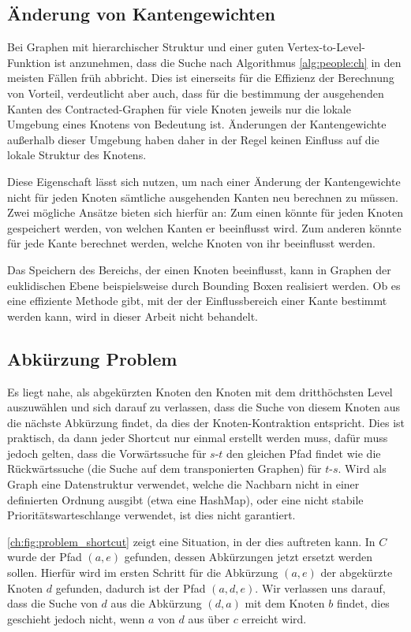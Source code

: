 \subsection{Änderung von Kantengewichten}

Bei Graphen mit hierarchischer Struktur und einer guten Vertex-to-Level-Funktion ist anzunehmen, dass die Suche nach Algorithmus \ref{alg:people:ch}  in den meisten Fällen früh abbricht.
Dies ist einerseits für die Effizienz der Berechnung von Vorteil, verdeutlicht aber auch, dass für die bestimmung der ausgehenden Kanten des Contracted-Graphen für viele Knoten jeweils nur die lokale Umgebung eines Knotens von Bedeutung ist.
Änderungen der Kantengewichte außerhalb dieser Umgebung haben daher in der Regel keinen Einfluss auf die lokale Struktur des Knotens.

Diese Eigenschaft lässt sich nutzen, um nach einer Änderung der Kantengewichte nicht für jeden Knoten sämtliche ausgehenden Kanten neu berechnen zu müssen.
Zwei mögliche Ansätze bieten sich hierfür an:
Zum einen könnte für jeden Knoten gespeichert werden, von welchen Kanten er beeinflusst wird.
Zum anderen könnte für jede Kante berechnet werden, welche Knoten von ihr beeinflusst werden.

Das Speichern des Bereichs, der einen Knoten beeinflusst, kann in Graphen der euklidischen Ebene beispielsweise durch Bounding Boxen realisiert werden. Ob es eine effiziente Methode gibt, mit der der Einflussbereich einer Kante bestimmt werden kann, wird in dieser Arbeit nicht behandelt.

\subsection{Abkürzung Problem}

Es liegt nahe, als abgekürzten Knoten den Knoten mit dem dritthöchsten Level auszuwählen und sich darauf zu verlassen, dass die Suche von diesem Knoten aus die nächste Abkürzung findet, da dies der Knoten-Kontraktion entspricht.
Dies ist praktisch, da dann jeder Shortcut nur einmal erstellt werden muss, dafür muss jedoch gelten, dass die Vorwärtssuche für $s$-$t$ den gleichen Pfad findet wie die Rückwärtssuche (die Suche auf dem transponierten Graphen) für $t$-$s$.
Wird als Graph eine Datenstruktur verwendet, welche die Nachbarn nicht in einer definierten Ordnung ausgibt (etwa eine HashMap), oder eine nicht stabile Prioritätswarteschlange verwendet, ist dies nicht garantiert.

\autoref{ch:fig:problem_shortcut} zeigt eine Situation, in der dies auftreten kann.
In $C$ wurde der Pfad $(a, e)$ gefunden, dessen Abkürzungen jetzt ersetzt werden sollen.
Hierfür wird im ersten Schritt für die Abkürzung $(a, e)$ der abgekürzte Knoten $d$ gefunden, dadurch ist der Pfad $(a, d, e)$.
Wir verlassen uns darauf, dass die Suche von $d$ aus die Abkürzung $(d, a)$ mit dem Knoten $b$ findet, dies geschieht jedoch nicht, wenn $a$ von $d$ aus über $c$ erreicht wird.

